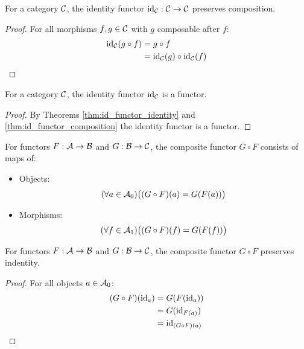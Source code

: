 \begin{theorem}\label{thm:id_functor_composition}

  For a category $\mathcal{C}$, the identity functor $\mathrm{id}_{\mathcal{C}}: \mathcal{C} \to \mathcal{C}$ preserves
  composition.

  \begin{proof}
    For all morphisms $f,g\in \mathcal{C}$ with $g$ composable after $f$:
    \[
      \begin{aligned}
        \mathrm{id}_{\mathcal{C}}(g\circ f)
        &= g\circ f\\
        &= \mathrm{id}_{\mathcal{C}}(g) \circ \mathrm{id}_{\mathcal{C}}(f)
      \end{aligned}
    \]
  \end{proof}
\end{theorem}

\begin{theorem}[$\id_\C$ is a Functor]
  For a category $\mathcal{C}$, the identity functor $\id_\C$ is a functor.

  \begin{proof}
    By Theorems \ref{thm:id_functor_identity} and
    \ref{thm:id_functor_composition} the identity functor is a functor.
  \end{proof}
\end{theorem}

\begin{definition}\label{def:functor_composition}

  For functors $F:\mathcal{A}\to \mathcal{B}$ and $G:\mathcal{B}\to \mathcal{C}$, the composite functor $G\circ F$
  consists of maps of:
  \parencite{leinster:basic_category_theory}
  \begin{itemize}
    \item Objects:
      \[(\forall a \in \mathcal{A}_0)
        \big((G\circ F)(a) = G(F(a))\big)\]
    \item Morphisms:
      \[(\forall f\in \mathcal{A}_1)
        \big((G\circ F)(f) = G(F(f))\big)\]
  \end{itemize}
\end{definition}

\begin{theorem}
  For functors $F:\mathcal{A}\to \mathcal{B}$ and $G:\mathcal{B}\to \mathcal{C}$, the composite functor $G\circ F$
  preserves indentity.

  \begin{proof}
    For all objects $a\in \mathcal{A}_0$:
    \[
      \begin{aligned}
        (G\circ F)(\mathrm{id}_a)
        &= G(F(\mathrm{id}_a))\\
        &= G(\mathrm{id}_{F(a)})\\
        &= \mathrm{id}_{(G\circ F)(a)}
      \end{aligned}
    \]
  \end{proof}
\end{theorem}

